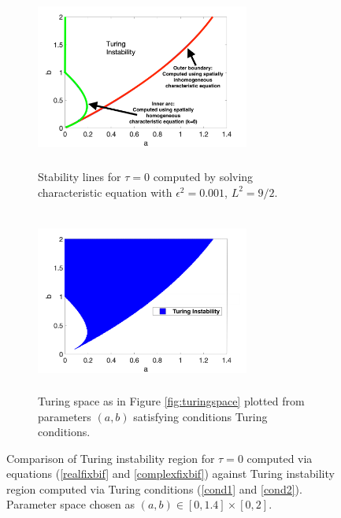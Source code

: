 \begin{figure}[H]
    \centering
    \begin{subfigure}[t]{0.47\textwidth}
        \centering
        \includegraphics[width=7cm,height = 6cm]{bif0.png}
        \caption{Stability lines for $\tau=0$ computed by solving characteristic equation with $\epsilon^2=0.001$, $L^2=9/2$.}
        \label{fig:bif0}
    \end{subfigure}
    \hfill
    \begin{subfigure}[t]{0.47\textwidth}
        \centering
        \includegraphics[width=7cm,height = 6cm]{turingspace.png}
        \caption{Turing space as in Figure \ref{fig:turingspace} plotted from parameters $(a,b)$ satisfying conditions Turing conditions.}
        \label{}
    \end{subfigure}
    \caption{Comparison of Turing instability region for $\tau=0$ computed via equations (\eqref{realfixbif} and \eqref{complexfixbif}) against Turing instability region computed via Turing conditions (\eqref{cond1} and \eqref{cond2}). Parameter space chosen as $(a,b)\in[0,1.4]\times[0,2]$.}
    \label{fig:tspace1}
\end{figure}

